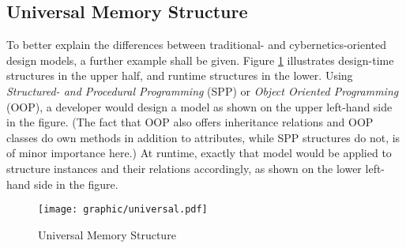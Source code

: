%
%
%
%
%
%
%

\subsection{Universal Memory Structure}
\label{universal_memory_structure_heading}

To better explain the differences between traditional- and cybernetics-oriented
design models, a further example shall be given. Figure \ref{universal_figure}
illustrates design-time structures in the upper half, and runtime structures in
the lower. Using \emph{Structured- and Procedural Programming} (SPP) or
\emph{Object Oriented Programming} (OOP), a developer would design a model as
shown on the upper left-hand side in the figure. (The fact that OOP also offers
inheritance relations and OOP classes do own methods in addition to attributes,
while SPP structures do not, is of minor importance here.) At runtime, exactly
that model would be applied to structure instances and their relations
accordingly, as shown on the lower left-hand side in the figure.

\begin{figure}[ht]
    \begin{center}
        \texttt{[image: graphic/universal.pdf]}
        \caption{Universal Memory Structure}
        \label{universal_figure}
    \end{center}
\end{figure}

